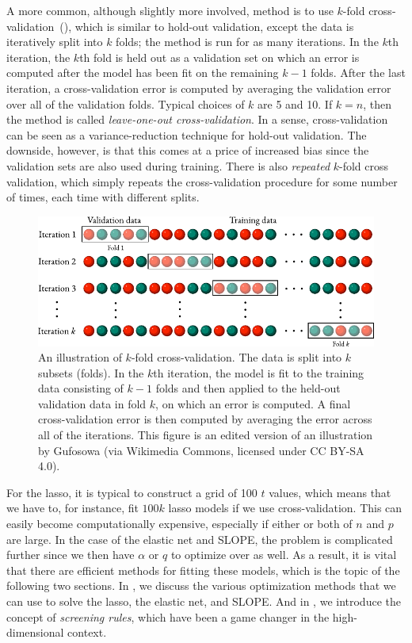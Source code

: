 A more common, although slightly more involved, method is to use \(k\)-fold cross-validation~(), which is similar to hold-out validation, except the data is iteratively split into \(k\) folds; the method is run for as many iterations. In the \(k\)th iteration, the \(k\)th fold is held out as a validation set on which an error is computed after the model has been fit on the remaining \(k-1\) folds. After the last iteration, a cross-validation error is computed by averaging the validation error over all of the validation folds. Typical choices of \(k\) are 5 and 10. If \(k=n\), then the method is called \emph{leave-one-out cross-validation}. In a sense, cross-validation can be seen as a variance-reduction technique for hold-out validation. The downside, however, is that this comes at a price of increased bias since the validation sets are also used during training. There is also \emph{repeated} \(k\)-fold cross validation, which simply repeats the cross-validation procedure for some number of times, each time with different splits.

\begin{figure}[htpb]
  \centering
  \includegraphics[width=\textwidth]{figures/kfold-cv.pdf}
  \caption{%
    An illustration of \(k\)-fold cross-validation. The data is split into \(k\) subsets (folds). In the \(k\)th iteration, the model is fit to the training data consisting of \(k-1\) folds and then applied to the held-out validation data in fold \(k\), on which an error is computed. A final cross-validation error is then computed by averaging the error across all of the iterations.
    This figure is an edited version of an illustration by Gufosowa (via Wikimedia Commons, licensed under CC BY-SA 4.0).
  }
  \label{fig:k-fold-cv}
\end{figure}

For the lasso, it is typical to construct a grid of 100 \(t\) values, which means that we have to, for instance, fit \(100k\) lasso models if we use cross-validation. This can easily become computationally expensive, especially if either or both of \(n\) and \(p\) are large. In the case of the elastic net and SLOPE, the problem is complicated further since we then have \(\alpha\) or \(q\) to optimize over as well. As a result, it is vital that there are efficient methods for fitting these models, which is the topic of the following two sections. In , we discuss the various optimization methods that we can use to solve the lasso, the elastic net, and SLOPE. And in , we introduce the concept of \emph{screening rules}, which have been a game changer in the high-dimensional context.

